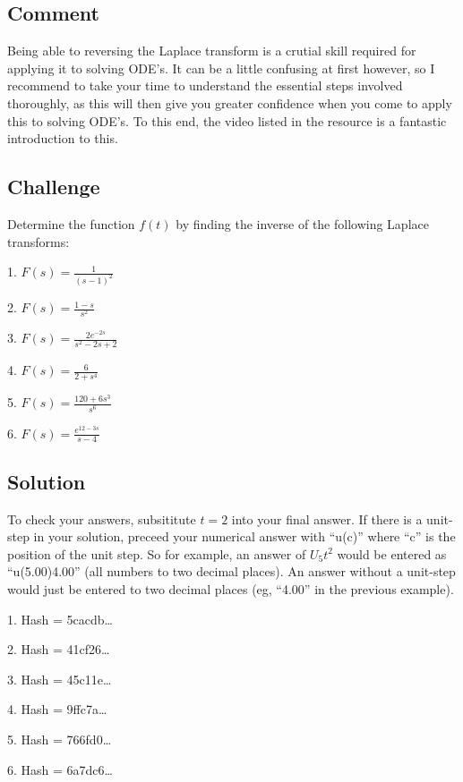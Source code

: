 \subsection*{Comment}
Being able to reversing the Laplace transform is a crutial skill required for applying it to solving ODE's. It can be a little confusing at first however, so I recommend to take your time to understand the essential steps involved thoroughly, as this will then give you greater confidence when you come to apply this to solving ODE's. To this end, the video listed in the resource is a fantastic introduction to this.

\subsection*{Challenge}
Determine the function $f(t)$ by finding the inverse of the following Laplace transforms:

1. $\displaystyle F(s)=\frac{1}{(s-1)^2}$

2. $\displaystyle F(s)=\frac{1-s}{s^2}$

3. $\displaystyle F(s)=\frac{2 e^{-2s}}{s^2-2s+2}$

4. $\displaystyle F(s)=\frac{6}{2+s^4}$

5. $\displaystyle F(s)=\frac{120+6s^3}{s^6}$

6. $\displaystyle F(s)=\frac{e^{12-3s}}{s-4}$


\subsection*{Solution}
To check your answers, subsititute $t=2$ into your final answer. If there is a unit-step in your solution, preceed your numerical answer with ``u(c)'' where ``c'' is the position of the unit step. So for example, an answer of $U_5 t^2$ would be entered as ``u(5.00)4.00'' (all numbers to two decimal places). An answer without a unit-step would just be entered to two decimal places (eg, ``4.00'' in the previous example).

1. Hash = 5cacdb\ldots

2. Hash = 41cf26\ldots

3. Hash = 45c11e\ldots

4. Hash = 9ffc7a\ldots

5. Hash = 766fd0\ldots

6. Hash = 6a7dc6\ldots
